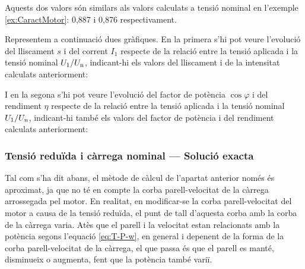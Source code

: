 \begin{exemple}
	Aquests dos valors són similars als valors calculats a tensió nominal en  l'exemple \ref{ex:CaractMotor}: 0,887 i 0,876 respectivament.
	
	Representem a continuació dues gràfiques. En la primera s'hi pot veure  l'evolució del lliscament $s$ i del corrent $I_1$ respecte de la relació entre la tensió aplicada i la tensió nominal $U_1/U_\mathrm{n}$, indicant-hi els valors del lliscament i de la intensitat calculats anteriorment:
	\begin{center}
		
	\end{center}

	I en la segona s'hi pot veure l'evolució del factor de potència $\cos\varphi$ i del rendiment $\eta$ respecte de la relació entre la tensió aplicada i la tensió nominal $U_1/U_\mathrm{n}$, indicant-hi també  els valors del factor de potència i del rendiment calculats anteriorment:
	\begin{center}
		
	\end{center}	
\end{exemple}

\subsubsection{Tensió reduïda i càrrega nominal --- Solució exacta}

Tal com s'ha dit abans, el mètode de càlcul de l'apartat anterior només és aproximat, ja que no té en compte la corba parell-velocitat de la càrrega arrossegada pel motor. En realitat, en modificar-se la corba parell-velocitat del motor a causa de la tensió reduïda, el punt de tall d'aquesta corba amb la corba de la càrrega varia. Atès que el parell i la velocitat estan relacionats amb la potència segons l'equació  \eqref{eq:T-P-w}, en general i depenent de la forma de la corba parell-velocitat de la càrrega, el que passa és que el parell es manté,  disminueix o augmenta, fent que la potència també variï.

